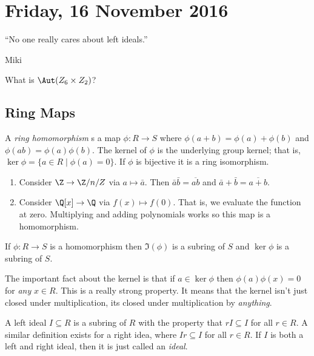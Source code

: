 \section{Friday, 16 November 2016}

\epigraph{``No one really cares about left ideals.''}{Miki}

\begin{problem}
What is $\Aut(Z_6 \times Z_2)$?
\end{problem}

\subsection{Ring Maps}

\begin{definition}
A \emph{ring homomorphism} s a map $\phi : R \to S$ where $\phi(a + b) = \phi(a) + \phi(b)$ and $\phi(ab) = \phi(a)\phi(b)$. The kernel of $\phi$ is the underlying group kernel; that is, $\ker \phi = \{a \in R \mid \phi(a) = 0\}$. If $\phi$ is bijective it is a ring isomorphism.
\end{definition}

\begin{example}
\begin{enumerate}
\item Consider $\Z \to \Z/n/Z$ via $a \mapsto \bar{a}$. Then $\bar{a}\bar{b} = \overline{ab}$ and $\bar{a} + \bar{b} = \overline{a + b}$.
\item Consider $\Q[x] \to \Q$ via $f(x) \mapsto f(0)$. That is, we evaluate the function at zero. Multiplying and adding polynomials works so this map is a homomorphism.
\end{enumerate}
\end{example}

\begin{proposition}
If $\phi : R \to S$ is a homomorphism then $\Im(\phi)$ is a subring of $S$ and $\ker \phi$ is a subring of $S$.
\end{proposition}

\begin{corollary}
The important fact about the kernel is that if $a \in \ker\phi$ then $\phi(a)\phi(x) = 0$ for \emph{any} $x \in R$. This is a really strong property. It means that the kernel isn't just closed under multiplication, its closed under multiplication by \emph{anything}.
\end{corollary}

\begin{definition}[Ideals]
A left ideal $I \subseteq R$ is a subring of $R$ with the property that $rI \subseteq I$ for all $r \in R$. A similar definition exists for a right idea, where $Ir \subseteq I$ for all $r \in R$. If $I$ is both a left and right ideal, then it is just called an \emph{ideal}.
\end{definition}

